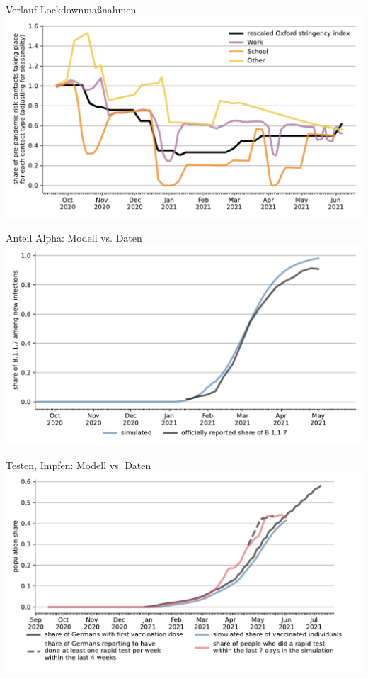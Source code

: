 \documentclass[11pt]{beamer}
\begin{document}
\begin{frame}{Verlauf Lockdownmaßnahmen}
    \centering
    \includegraphics[width=\textwidth]{figures/results/figures/data/stringency2_with_seasonality}
\end{frame}


\begin{frame}{Anteil Alpha: Modell vs. Daten}
    \centering
    \includegraphics[width=\textwidth]{figures/results/figures/scenario_comparisons/combined_fit/full_share_b117}
\end{frame}


\begin{frame}{Testen, Impfen: Modell vs. Daten}
    \centering
    \includegraphics[width=\textwidth]{figures/results/figures/scenario_comparisons/combined_fit/full_share_rapid_test_in_last_week_and_vaccinated}
\end{frame}
\end{document}
